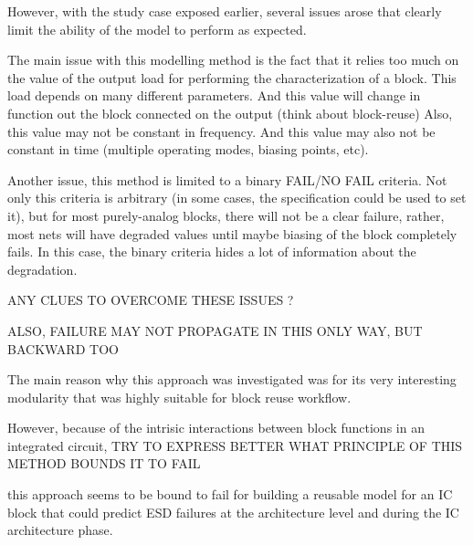 However, with the study case exposed earlier, several issues arose that clearly limit the ability of the model to perform as expected.

The main issue with this modelling method is the fact that it relies too much
on the value of the output load for performing the characterization of a block.
This load depends on many different parameters.
And this value will change in function out the block connected on the output (think about block-reuse)
Also, this value may not be constant in frequency.
And this value may also not be constant in time (multiple operating modes, biasing points, etc).



Another issue, this method is limited to a binary FAIL/NO FAIL criteria.
Not only this criteria is arbitrary (in some cases, the specification could be used to set it), but
for most purely-analog blocks, there will not be a clear failure, rather, most
nets will have degraded values until maybe biasing of the block completely fails.
In this case, the binary criteria hides a lot of information about the degradation.

ANY CLUES TO OVERCOME THESE ISSUES ?

ALSO, FAILURE MAY NOT PROPAGATE IN THIS ONLY WAY, BUT BACKWARD TOO

The main reason why this approach was investigated was for its very interesting modularity
that was highly suitable for block reuse workflow.

However, because of the intrisic interactions between block functions in an integrated circuit,
TRY TO EXPRESS BETTER WHAT PRINCIPLE OF THIS METHOD BOUNDS IT TO FAIL

this approach seems to be bound to fail for building a reusable model for an IC block that could predict
ESD failures at the architecture level and during the IC architecture phase.
